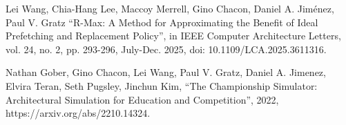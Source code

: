 
\begin{cventries}
\cventry
    {} %
    {} %
    {} %
    {} %
    {
      \begin{cvitems} %
          \item {Lei Wang, Chia-Hang Lee, Maccoy Merrell, Gino Chacon, Daniel A. Jiménez, Paul V. Gratz ``R-Max: A Method for Approximating the Benefit of Ideal Prefetching and Replacement Policy'', in IEEE Computer Architecture Letters, vol. 24, no. 2, pp. 293-296, July-Dec. 2025, doi: 10.1109/LCA.2025.3611316.}
         \item {Nathan Gober, Gino Chacon, Lei Wang, Paul V. Gratz, Daniel A. Jimenez, Elvira Teran, Seth Pugsley, Jinchun Kim, ``The Championship Simulator: Architectural Simulation for Education and Competition'',
         2022, https://arxiv.org/abs/2210.14324.}                
      \end{cvitems}
    }
\end{cventries}

